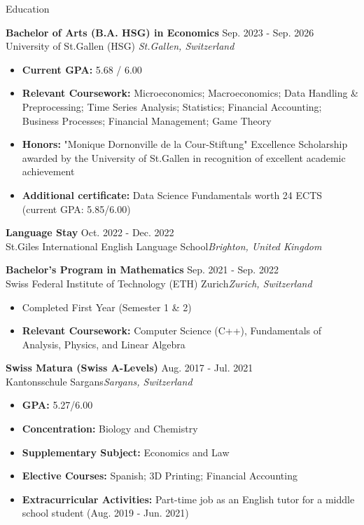 \documentclass{resume}
\begin{document}
\begin{rSection}{Education}

\textbf{Bachelor of Arts (B.A. HSG) in Economics} \hfill Sep. 2023 - Sep. 2026\\
University of St.Gallen (HSG)
\hfill \textit{St.Gallen, Switzerland}
\begin{itemize}
    \setlength\itemsep{-0.5em}
    \item \textbf{Current GPA:} 5.68 / 6.00
    \item \textbf{Relevant Coursework:}  Microeconomics; Macroeconomics; Data Handling \& Preprocessing; Time Series Analysis; Statistics; Financial Accounting; Business Processes; Financial Management; Game Theory
    \item \textbf{Honors:} "Monique Dornonville de la Cour-Stiftung" Excellence Scholarship awarded by the University of St.Gallen in recognition of excellent academic achievement 
    \item \textbf{Additional certificate:} Data Science Fundamentals worth 24 ECTS (current GPA: 5.85/6.00)
\end{itemize}

\textbf{Language Stay} \hfill Oct. 2022 - Dec. 2022\\
	St.Giles International English Language School\hfill \textit{Brighton, United Kingdom}

	\textbf{Bachelor’s Program in Mathematics } \hfill Sep. 2021 - Sep. 2022\\
	Swiss Federal Institute of Technology (ETH) Zurich\hfill \textit{Zurich, Switzerland}
	\begin{itemize}
    	\setlength\itemsep{-0.5em}
    	\item Completed First Year (Semester 1 \& 2)
    	\item \textbf{Relevant Coursework:}  Computer Science (C++), Fundamentals of Analysis, Physics, and Linear Algebra 
	\end{itemize}
    \textbf{Swiss Matura (Swiss A-Levels)} \hfill Aug. 2017 - Jul. 2021\\
	Kantonsschule Sargans\hfill \textit{Sargans, Switzerland}
	\begin{itemize}
    	\setlength\itemsep{-0.5em}
    	\item \textbf{GPA:} 5.27/6.00
            \item \textbf{Concentration:} Biology and Chemistry
            \item \textbf{Supplementary Subject:} Economics and Law
            \item \textbf{Elective Courses:} Spanish; 3D Printing; Financial Accounting
    	\item \textbf{Extracurricular Activities:} Part-time job as an English tutor for a middle school student (Aug. 2019 - Jun. 2021) 
	\end{itemize}
	\end{rSection}
\end{document}
